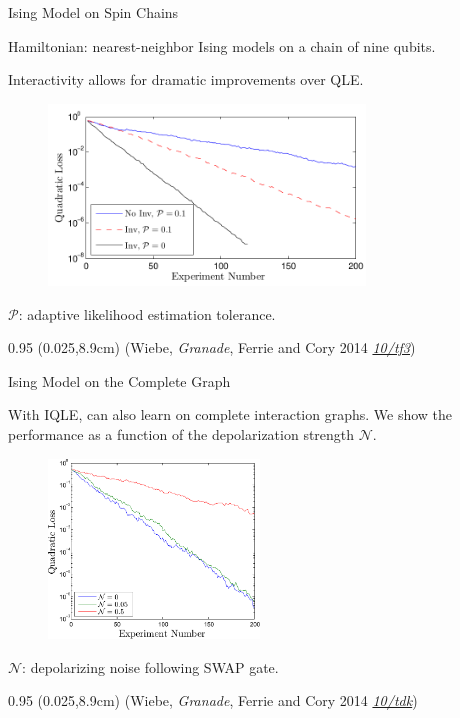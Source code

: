 \documentclass[xcolor=dvipsnames, compress]{beamer}
\renewcommand\UrlFont{\color{red}\rmfamily\itshape}
\newcommand{\shortdoi}[1]{\href{http://doi.org/#1}{\UrlFont 10/#1}}
\newcommand{\bottomnote}[1]{
  \begin{textblock*}{0.95\paperwidth} (0.025\paperwidth,8.9cm)
    {\tiny \hfill #1}
  \end{textblock*}
}
\begin{document}
\begin{frame}{Ising Model on Spin Chains}

    Hamiltonian: nearest-neighbor Ising models on a chain
    of nine qubits.

    Interactivity allows for dramatic improvements over
    QLE.
    
    \begin{figure}
      \includegraphics[width=0.75\textwidth]{poison}
    \end{figure}

    $\mathcal{P}$: adaptive likelihood estimation tolerance.

  \bottomnote{(Wiebe, \emph{Granade}, Ferrie and Cory 2014 \shortdoi{tf3})}

\end{frame}

\begin{frame}{Ising Model on the Complete Graph}
    
    With IQLE, can also learn on complete interaction graphs.
    We show the performance as a function of
    the depolarization strength $\mathcal{N}$.
    
    \begin{figure}
      \centering
      \includegraphics[width=0.5\textwidth]{tpnoise}
    \end{figure}

    $\mathcal{N}$: depolarizing noise following SWAP gate.

  \bottomnote{(Wiebe, \emph{Granade}, Ferrie and Cory 2014 \shortdoi{tdk})}
    
\end{frame}
\end{document}
